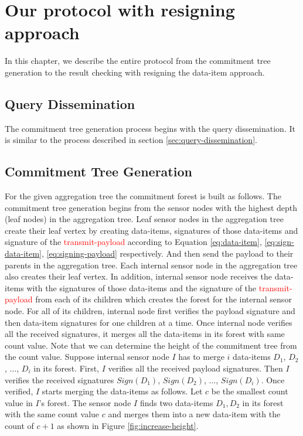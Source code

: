 \chapter{Our protocol with resigning approach }
	In this chapter, we describe the entire protocol from the commitment tree generation to the result checking with resigning the data-item approach.

\section{Query Dissemination}
	The commitment tree generation process begins with the query dissemination.
	It is similar to the process described in section \ref{sec:query-dissemination}.

\section{Commitment Tree Generation}
	For the given aggregation tree the commitment forest is built as follows.
	The commitment tree generation begins from the sensor nodes with the highest depth (leaf nodes) in the aggregation tree.
	Leaf sensor nodes in the aggregation tree create their leaf vertex by creating data-items, signatures of those data-items and signature of the \textcolor{red}{transmit-payload} according to Equation \ref{eq:data-item}, \ref{eq:sign-data-item}, \ref{eq:signing-payload} respectively.
	And then send the payload to their parents in the aggregation tree.	
	Each internal sensor node in the aggregation tree also creates their leaf vertex.
	In addition, internal sensor node receives the data-items with the signatures of those data-items and the signature of the \textcolor{red}{transmit-payload} from each of its children which creates the forest for the internal sensor node.
	For all of its children, internal node first verifies the payload signature and then data-item signatures for one children at a time.
	Once internal node verifies all the received signatures, it merges all the data-items in its forest with same count value.
	Note that we can determine the height of the commitment tree from the count value.
	Suppose internal sensor node $I$ has to merge $i$ data-items $D_{1}$, $D_{2}$, $\dotsc$, $D_{i}$ in its forest.
	First, $I$ verifies all the received payload signatures.
	Then $I$ verifies the received signatures $Sign(D_{1})$, $Sign(D_{2})$, $\dotsc$, $Sign(D_{i})$.
	Once verified, $I$ starts merging the data-items as follows.
	Let $c$ be the smallest count value in $I$'s forest.
	The sensor node $I$ finds two data-items $D_{1},D_{2}$ in its forest with the same count value $c$ and merges them into a new data-item with the count of $c+1$ as shown in Figure \ref{fig:increase-height}.
